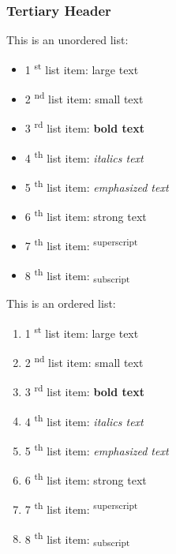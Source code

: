 \documentclass[12pt]{article}
\begin{document}
\subsubsection{Tertiary Header}
This is an unordered list: \par
\begin{itemize}
    \item 1\textsuperscript{ st} list item: {\Large large text}
    \item 2\textsuperscript{ nd} list item: {\scriptsize small text}
    \item 3\textsuperscript{ rd} list item: \textbf{ bold text}
    \item 4\textsuperscript{ th} list item: \textit{ italics text}
    \item 5\textsuperscript{ th} list item: \emph{ emphasized text}
    \item 6\textsuperscript{ th} list item: \textmd{ strong text}
    \item 7\textsuperscript{ th} list item: \textsuperscript{ superscript}
    \item 8\textsuperscript{ th} list item: \textsubscript{ subscript}
\end{itemize}
This is an ordered list: \par
\begin{enumerate}
    \item 1\textsuperscript{ st} list item: {\Large large text}
    \item 2\textsuperscript{ nd} list item: {\scriptsize small text}
    \item 3\textsuperscript{ rd} list item: \textbf{ bold text}
    \item 4\textsuperscript{ th} list item: \textit{ italics text}
    \item 5\textsuperscript{ th} list item: \emph{ emphasized text}
    \item 6\textsuperscript{ th} list item: \textmd{ strong text}
    \item 7\textsuperscript{ th} list item: \textsuperscript{ superscript}
    \item 8\textsuperscript{ th} list item: \textsubscript{ subscript}
\end{enumerate}
\end{document}
